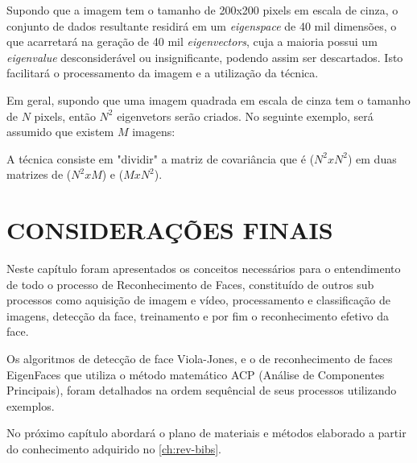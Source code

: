Supondo que a imagem tem o tamanho de 200x200 pixels em escala de cinza, o conjunto de dados resultante residirá em um \textit{eigenspace} de 40 mil dimensões, o que acarretará na geração de 40 mil \textit{eigenvectors}, cuja a maioria possui um \textit{eigenvalue} desconsiderável ou insignificante, podendo assim ser descartados. Isto facilitará o processamento da imagem e a utilização da técnica. 

Em geral, supondo que uma imagem quadrada em escala de cinza tem o tamanho de  $ N $ pixels, então $N^2$ eigenvetors serão criados. No seguinte exemplo, será assumido que existem $ M $ imagens:

A técnica consiste em "dividir" a matriz de covariância que é ($ N^2 x N^2 $) em duas matrizes de ($ N^2 x M $) e ($ M x N^2 $). 




\section{CONSIDERAÇÕES FINAIS}\label{sec:revbib_consid_finais}

Neste capítulo foram apresentados os conceitos necessários para o entendimento de todo o processo de Reconhecimento de Faces, constituído de outros sub processos como aquisição de imagem e vídeo, processamento e  classificação de imagens, detecção da face, treinamento e por fim o reconhecimento efetivo da face.

Os algoritmos de detecção de face Viola-Jones, e o de reconhecimento de faces EigenFaces que utiliza o método matemático ACP (Análise de Componentes Principais), foram detalhados na ordem sequêncial de seus processos utilizando exemplos.

No próximo capítulo abordará o plano de materiais e métodos elaborado a partir do conhecimento adquirido no \autoref{ch:rev-bibs}.
























